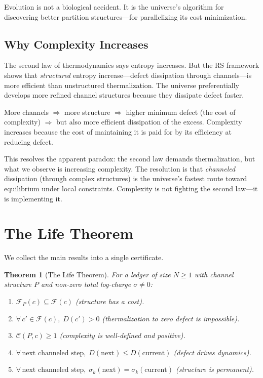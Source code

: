 \documentclass[11pt,a4paper]{article}
\theoremstyle{plain}
\newtheorem{theorem}{Theorem}[section]
\theoremstyle{definition}
\theoremstyle{remark}
\newcommand{\F}{\mathcal{F}}
\begin{document}
Evolution is not a biological accident.
It is the universe's algorithm for discovering better partition structures---for parallelizing its cost minimization.

\subsection{Why Complexity Increases}

The second law of thermodynamics says entropy increases.
But the RS framework shows that \emph{structured} entropy increase---defect dissipation through channels---is more efficient than unstructured thermalization.
The universe preferentially develops more refined channel structures because they dissipate defect faster.

More channels $\Rightarrow$ more structure $\Rightarrow$ higher minimum defect (the cost of complexity) $\Rightarrow$ but also more efficient dissipation of the excess.
Complexity increases because the cost of maintaining it is paid for by its efficiency at reducing defect.

This resolves the apparent paradox: the second law demands thermalization, but what we observe is increasing complexity.
The resolution is that \emph{channeled} dissipation (through complex structures) is the universe's fastest route toward equilibrium under local constraints.
Complexity is not fighting the second law---it is implementing it.

\section{The Life Theorem}\label{sec:certificate}

We collect the main results into a single certificate.

\begin{theorem}[The Life Theorem]\label{thm:life}
For a ledger of size $N \ge 1$ with channel structure $P$ and non-zero total log-charge $\sigma \ne 0$:
\begin{enumerate}[nosep,label=(\roman*)]
\item $\F_P(c) \subseteq \F(c)$ \quad (structure has a cost).
\item $\forall\, c' \in \F(c),\; D(c') > 0$ \quad (thermalization to zero defect is impossible).
\item $\mathcal{C}(P,c) \ge 1$ \quad (complexity is well-defined and positive).
\item $\forall\, \text{next channeled step},\; D(\text{next}) \le D(\text{current})$ \quad (defect drives dynamics).
\item $\forall\, \text{next channeled step},\; \sigma_k(\text{next}) = \sigma_k(\text{current})$ \quad (structure is permanent).
\end{enumerate}
\end{theorem}
\end{document}
